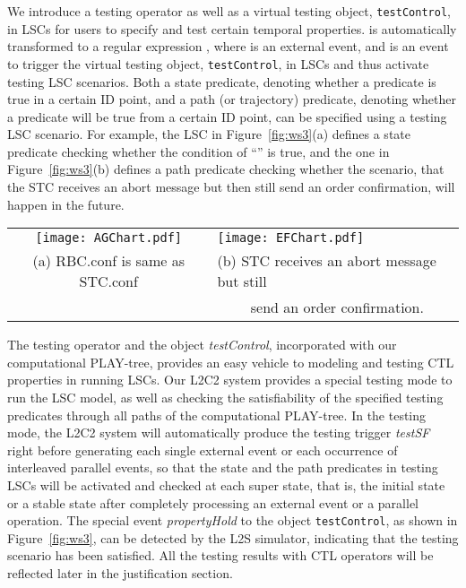 \documentclass[]{llncs}
\begin{document}
We introduce a testing operator  as well as a virtual
testing object, {\tt testControl}, in LSCs  for users to specify
and test certain temporal properties.  is automatically
transformed to a regular expression , where  is
an external event, and  is an event to trigger the
virtual testing object, {\tt testControl}, in LSCs and
thus activate testing LSC scenarios.
Both a state predicate, denoting whether a predicate is true
in a certain ID point, and a path (or trajectory) predicate,
denoting whether a predicate will be true from a certain ID point,
can be specified using a testing LSC scenario.
For example, the LSC in Figure~\ref{fig:ws3}(a) defines a
state predicate checking whether the condition of
``'' is true, and the one in Figure~\ref{fig:ws3}(b)
defines a path predicate checking whether the scenario,
that the STC receives an abort message but then still
send an order confirmation, will happen in the future.

\begin{figure*}[!ht]
	\centering
	\begin{tabular}{cl}
		\texttt{[image: AGChart.pdf]}
		&
		\texttt{[image: EFChart.pdf]} \\
	  (a) RBC.conf is same as STC.conf
	  &
	  (b) STC receives an abort message but still\\
	  & ~~~~ send an order confirmation.
	\end{tabular}
\caption{State and Path predicates specification}
\label{fig:ws3}
\end{figure*}

The testing operator  and the object {\em testControl},
incorporated with our computational PLAY-tree, provides
an easy vehicle to modeling and testing CTL properties in running LSCs.
Our L2C2 system provides a special testing mode to run the LSC model,
as well as checking the satisfiability of the specified testing
predicates through all paths of the computational PLAY-tree.
In the testing mode, the L2C2 system will automatically
produce the testing trigger {\em testSF} right before generating
each single external event or each occurrence of interleaved parallel events,
so that the state and the path predicates in testing LSCs will be activated
and checked at each super state, that is, the initial state or
a stable state after completely processing an external event or a parallel operation.
The special event {\em propertyHold} to the object {\tt testControl},
as shown in Figure~\ref{fig:ws3}, can be detected by the L2S simulator, indicating
that the testing scenario has been satisfied. All the testing results
with CTL operators will be reflected later in the justification section.
\end{document}
